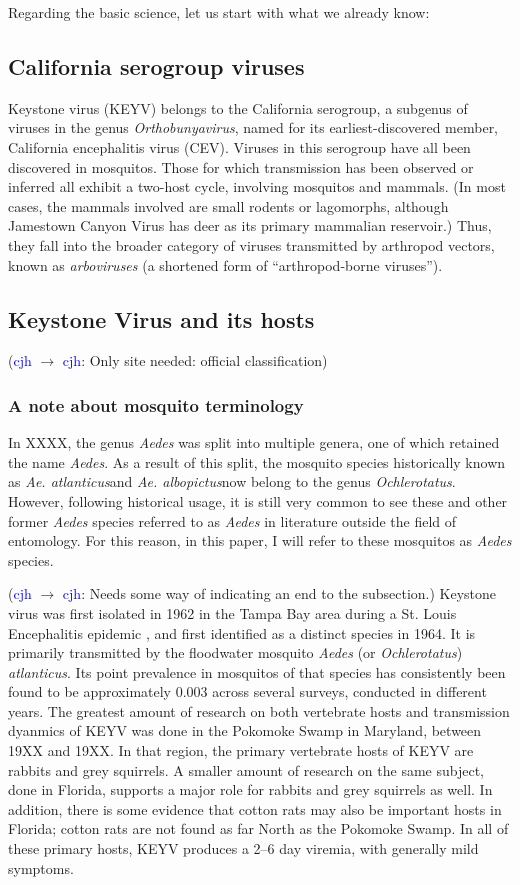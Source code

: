 \documentclass[12pt]{article}
\newcommand{\alb}{\textit{Ae. albopictus}}
\newcommand{\atl}{\textit{Ae. atlanticus}}
\newcommand{\cjh}{\textcolor{blue}{cjh}}
\newcommand{\msg}[3]{(#1 $\rightarrow$ #2: #3)}
\newcommand{\mcc}[1]{\msg\cjh\cjh{#1}}
\begin{document}
        Regarding the basic science, let us start with what we already know:

        \subsection{California serogroup viruses}
            Keystone virus (KEYV) belongs to the California serogroup, a subgenus of viruses in the genus \textit{Orthobunyavirus}, named for its earliest-discovered member, California encephalitis virus (CEV). Viruses in this serogroup have all been discovered in mosquitos. Those for which transmission has been observed or inferred all exhibit a two-host cycle, involving mosquitos and mammals. (In most cases, the mammals involved are small rodents or lagomorphs, although Jamestown Canyon Virus has deer as its primary mammalian reservoir.) Thus, they fall into the broader category of viruses transmitted by arthropod vectors, known as \textit{arboviruses} (a shortened form of ``arthropod-borne viruses'').
        
        \subsection{Keystone Virus and its hosts}
            \mcc{Only site needed: official classification}
            \subsubsection{A note about mosquito terminology}
                In XXXX, the genus \textit{Aedes} was split into multiple genera, one of which retained the name \textit{Aedes}. As a result of this split, the mosquito species historically known as \atl and \alb now belong to the genus \textit{Ochlerotatus}. However, following historical usage, it is still very common to see these and other former \textit{Aedes} species referred to as \textit{Aedes} in literature outside the field of entomology. For this reason, in this paper, I will refer to these mosquitos as \textit{Aedes} species.

            \mcc{Needs some way of indicating an end to the subsection.}
            Keystone virus was first isolated in 1962 in the Tampa Bay area during a St. Louis Encephalitis epidemic \cite{asdf}, and first identified as a distinct species in 1964. It is primarily transmitted by the floodwater mosquito \textit{Aedes} (or \textit{Ochlerotatus}) \textit{atlanticus}. Its point prevalence in mosquitos of that species has consistently been found to be approximately 0.003 across several surveys, conducted in different years. The greatest amount of research on both vertebrate hosts and transmission dyanmics of KEYV was done in the Pokomoke Swamp in Maryland, between 19XX and 19XX. In that region, the primary vertebrate hosts of KEYV are rabbits and grey squirrels. A smaller amount of research on the same subject, done in Florida, supports a major role for rabbits and grey squirrels as well. In addition, there is some evidence that cotton rats may also be important hosts in Florida\cite{asdf}; cotton rats are not found as far North as the Pokomoke Swamp. In all of these primary hosts, KEYV produces a 2--6 day viremia, with generally mild symptoms.
\end{document}
